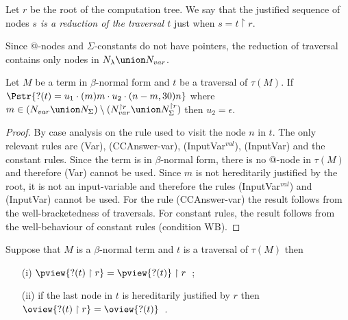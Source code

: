 \begin{dfn}
Let $r$ be the root of the computation tree. We say that the
justified sequence of nodes \emph{$s$ is a reduction of the
traversal $t$} just when $s = t \upharpoonright r$.
\end{dfn}

Since @-nodes and $\Sigma$-constants do not have pointers, the
reduction of traversal contains only nodes in $N_\lambda \union
N_{var}$.


\begin{lem}
\label{lem:var_followedby_child} Let $M$ be a term in $\beta$-normal
form and $t$ be a traversal of $\tau(M)$. If
$\Pstr{ ?(t) = u_1 \cdot (m){m} \cdot u_2 \cdot (n-m,30){n} }$
 where $m \in (N_{var} \union N_{\Sigma}) \setminus (N^{\upharpoonright r}_{var} \union N^{\upharpoonright r}_{\Sigma})$
then $u_2 = \epsilon$.
\end{lem}
\begin{proof}
By case analysis on the rule used to visit the node
$n$ in $t$. The only relevant rules are (Var), (CCAnswer-var), (InputVar$^{val}$), (InputVar)
and the constant rules.
Since the term is in $\beta$-normal form, there is no @-node in $\tau(M)$ and therefore (Var) cannot be used.
Since $m$ is not hereditarily justified by the root, it is not an input-variable and therefore the rules
(InputVar$^{val}$) and (InputVar) cannot be used.
For the rule (CCAnswer-var) the result follows from the well-bracketedness of traversals.
For constant rules, the result follows from the well-behaviour of constant rules (condition WB).
\end{proof}

\begin{lem}
\label{lem:redtrav_trav} Suppose that $M$ is a $\beta$-normal term and $t$ is a traversal of $\tau(M)$ then
\begin{itemize}
\item[(i)] $ \pview{?(t) \upharpoonright  r } = \pview{?(t)} \upharpoonright r$\ ;
\item[(ii)] if the last node in $t$ is hereditarily justified by $r$ then $ \oview{?(t) \upharpoonright r } = \oview{?(t)}$\ .
\end{itemize}
\end{lem}

